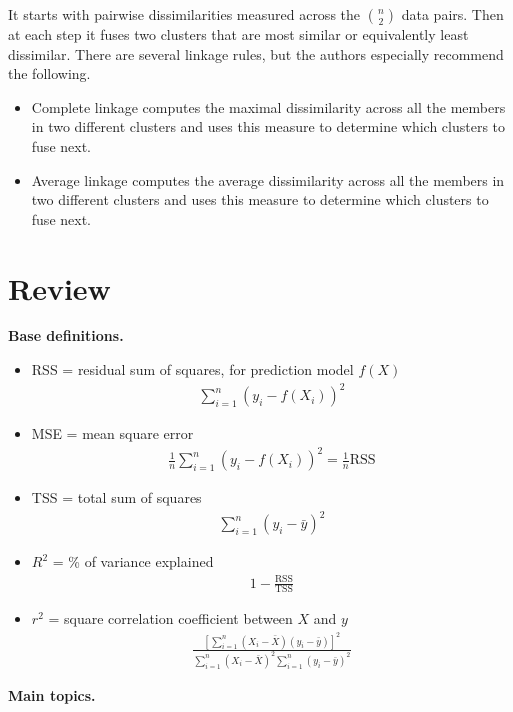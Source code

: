 \documentclass[12pt, letterpaper]{article}
\begin{document}
It starts with pairwise dissimilarities measured across the $n\choose 2$ data pairs. Then at 
each step it fuses two clusters that are most similar or equivalently least dissimilar. There are 
several linkage rules, but the authors especially recommend the following.
\begin{itemize}
    \item Complete linkage computes the maximal dissimilarity across all the members in two different
    clusters and uses this measure to determine which clusters to fuse next.
    \item Average linkage computes the average dissimilarity across all the members in two different 
    clusters and uses this measure to determine which clusters to fuse next.
\end{itemize}

\section{Review}
\textbf{Base definitions.}
\begin{itemize}
    \item RSS = residual sum of squares, for prediction model $f(X)$ 
    \begin{align*}
        \sum_{i=1}^{n}(y_i - f(X_i))^2
    \end{align*}
    \item MSE = mean square error
    \begin{align*}
        \frac 1n \sum_{i=1}^{n}(y_i - f(X_i))^2 = \frac 1n \text{RSS}
    \end{align*}
    \item TSS = total sum of squares
    \begin{align*}
        \sum_{i=1}^{n}(y_i-\bar y)^2
    \end{align*}
    \item $R^2$ = \% of variance explained
    \begin{align*}
        1 - \frac{\text{RSS}}{\text{TSS}}
    \end{align*}
    \item $r^2$ = square correlation coefficient between $X$ and $y$
    \begin{align*}
        \frac{\left[ \sum_{i=1}^{n}(X_i - \bar X)(y_i - \bar y) \right]^2}{\sum_{i=1}^{n}(X_i - \bar X)^2 \sum_{i=1}^{n}(y_i - \bar y)^2}
    \end{align*}
\end{itemize}
\textbf{Main topics.} 
\end{document}
